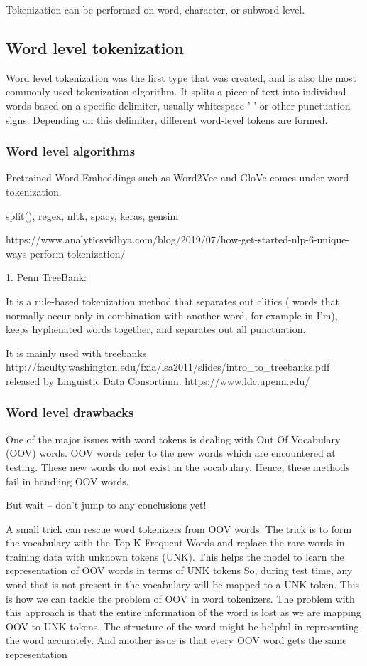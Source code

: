 Tokenization can be performed on word, character, or subword level.

\subsection{Word level tokenization}

Word level tokenization was the first type that was created, and is also the most commonly used tokenization algorithm. It splits a piece of text into individual words based on a specific delimiter, usually whitespace ' ' or other punctuation signs. Depending on this delimiter, different word-level tokens are formed.

\subsubsection{Word level algorithms}

Pretrained Word Embeddings such as Word2Vec and GloVe comes under word tokenization.

split(), regex, nltk, spacy, keras, gensim

https://www.analyticsvidhya.com/blog/2019/07/how-get-started-nlp-6-unique-ways-perform-tokenization/

1. Penn TreeBank:

It is a rule-based tokenization method that separates out clitics ( words that normally occur only in combination with another word, for example in I’m), keeps hyphenated words together, and separates out all punctuation.

It is mainly used with treebanks http://faculty.washington.edu/fxia/lsa2011/slides/intro\_to\_treebanks.pdf released by Linguistic Data Consortium. https://www.ldc.upenn.edu/

\subsubsection{Word level drawbacks}

One of the major issues with word tokens is dealing with Out Of Vocabulary (OOV) words. OOV words refer to the new words which are encountered at testing. These new words do not exist in the vocabulary. Hence, these methods fail in handling OOV words.

But wait – don’t jump to any conclusions yet!

    A small trick can rescue word tokenizers from OOV words. The trick is to form the vocabulary with the Top K Frequent Words and replace the rare words in training data with unknown tokens (UNK). This helps the model to learn the representation of OOV words in terms of UNK tokens
    So, during test time, any word that is not present in the vocabulary will be mapped to a UNK token. This is how we can tackle the problem of OOV in word tokenizers.
    The problem with this approach is that the entire information of the word is lost as we are mapping OOV to UNK tokens. The structure of the word might be helpful in representing the word accurately. And another issue is that every OOV word gets the same representation

